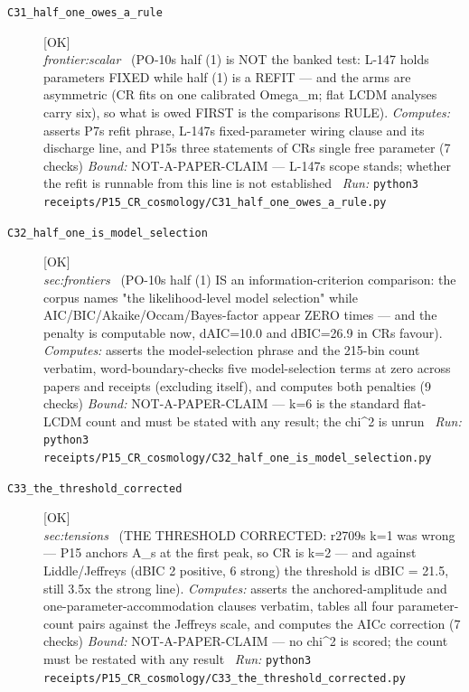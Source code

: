 \begin{description}
\item[\label{rcpt:C31_half_one_owes_a_rule}\texttt{C31\_half\_one\_owes\_a\_rule}]\hfill\textsf{[OK]}\\
\textit{frontier:scalar} \ (PO-10s half (1) is NOT the banked test: L-147 holds parameters FIXED while half (1) is a REFIT --- and the arms are asymmetric (CR fits on one calibrated Omega\_m; flat LCDM analyses carry six), so what is owed FIRST is the comparisons RULE). 
\emph{Computes:} asserts P7s refit phrase, L-147s fixed-parameter wiring clause and its discharge line, and P15s three statements of CRs single free parameter (7 checks)
 \emph{Bound:} NOT-A-PAPER-CLAIM --- L-147s scope stands; whether the refit is runnable from this line is not established
\ \emph{Run:} \texttt{python3 receipts/P15\_CR\_cosmology/C31\_half\_one\_owes\_a\_rule.py}
\item[\label{rcpt:C32_half_one_is_model_selection}\texttt{C32\_half\_one\_is\_model\_selection}]\hfill\textsf{[OK]}\\
\textit{sec:frontiers} \ (PO-10s half (1) IS an information-criterion comparison: the corpus names "the likelihood-level model selection" while AIC/BIC/Akaike/Occam/Bayes-factor appear ZERO times --- and the penalty is computable now, dAIC=10.0 and dBIC=26.9 in CRs favour). 
\emph{Computes:} asserts the model-selection phrase and the 215-bin count verbatim, word-boundary-checks five model-selection terms at zero across papers and receipts (excluding itself), and computes both penalties (9 checks)
 \emph{Bound:} NOT-A-PAPER-CLAIM --- k=6 is the standard flat-LCDM count and must be stated with any result; the chi\textasciicircum{}2 is unrun
\ \emph{Run:} \texttt{python3 receipts/P15\_CR\_cosmology/C32\_half\_one\_is\_model\_selection.py}
\item[\label{rcpt:C33_the_threshold_corrected}\texttt{C33\_the\_threshold\_corrected}]\hfill\textsf{[OK]}\\
\textit{sec:tensions} \ (THE THRESHOLD CORRECTED: r2709s k=1 was wrong --- P15 anchors A\_s at the first peak, so CR is k=2 --- and against Liddle/Jeffreys (dBIC 2 positive, 6 strong) the threshold is dBIC = 21.5, still 3.5x the strong line). 
\emph{Computes:} asserts the anchored-amplitude and one-parameter-accommodation clauses verbatim, tables all four parameter-count pairs against the Jeffreys scale, and computes the AICc correction (7 checks)
 \emph{Bound:} NOT-A-PAPER-CLAIM --- no chi\textasciicircum{}2 is scored; the count must be restated with any result
\ \emph{Run:} \texttt{python3 receipts/P15\_CR\_cosmology/C33\_the\_threshold\_corrected.py}

\end{description}
